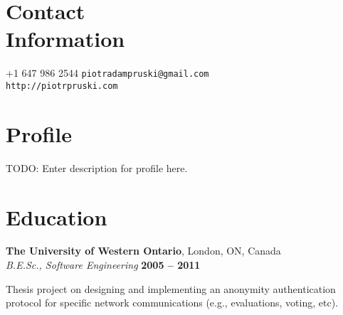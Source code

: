 \documentclass[margin,line]{resume}
\begin{document}
\begin{resume}

\section{\mysidestyle Contact\\Information}

	+1 647 986 2544	\hfill \texttt{piotradampruski@gmail.com}	\vspace{0mm}\\\vspace{0mm}
			\hfill \texttt{http://piotrpruski.com}		\vspace{0mm}\\\vspace{-4.5mm}

\section{\mysidestyle Profile}

	TODO: Enter description for profile here.

\section{\mysidestyle Education}

	\textbf{The University of Western Ontario}, London, ON, Canada	\vspace{2mm}\\\vspace{1mm}
	\textsl{B.E.Sc., Software Engineering}	\hfill \textbf{ 2005 -- 2011}\vspace{-3mm}\\\vspace{-1mm}
	\begin{list2}
		\item Thesis project on designing and implementing an anonymity authentication protocol for specific network communications (e.g., evaluations, voting, etc).
	\end{list2}\vspace{-1.5mm}


\end{resume}
\end{document}
